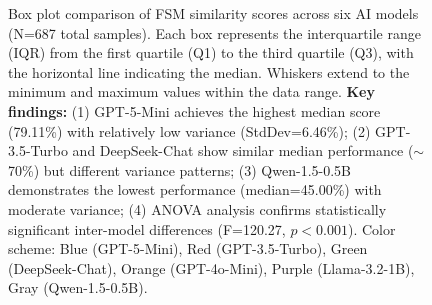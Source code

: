 \documentclass[12pt]{article}
\begin{document}
\begin{figure}[htbp]

\vspace{0.5cm}

\caption{Box plot comparison of FSM similarity scores across six AI models (N=687 total samples). Each box represents the interquartile range (IQR) from the first quartile (Q1) to the third quartile (Q3), with the horizontal line indicating the median. Whiskers extend to the minimum and maximum values within the data range. \textbf{Key findings:} (1) GPT-5-Mini achieves the highest median score (79.11\%) with relatively low variance (StdDev=6.46\%); (2) GPT-3.5-Turbo and DeepSeek-Chat show similar median performance ($\sim$70\%) but different variance patterns; (3) Qwen-1.5-0.5B demonstrates the lowest performance (median=45.00\%) with moderate variance; (4) ANOVA analysis confirms statistically significant inter-model differences (F=120.27, $p<0.001$). Color scheme: Blue (GPT-5-Mini), Red (GPT-3.5-Turbo), Green (DeepSeek-Chat), Orange (GPT-4o-Mini), Purple (Llama-3.2-1B), Gray (Qwen-1.5-0.5B).}
\label{fig:fsm-boxplot-comparison}
\end{figure}

\vspace{1cm}
\end{document}
